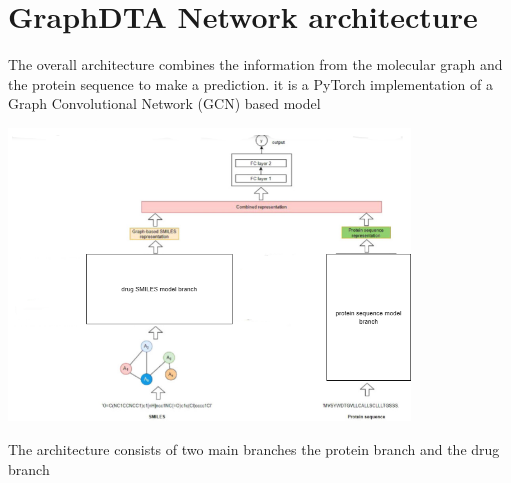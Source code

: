 \documentclass[11pt, a4paper]{article}
\begin{document}
\section{GraphDTA Network architecture}
    The overall architecture combines the information from the molecular graph and the protein sequence to make a prediction. it is a PyTorch implementation of a Graph Convolutional Network (GCN) based model

    \begin{center}
        \includegraphics[width=0.8\textwidth]{model/architecture.drawio.png}
    \end{center}

    The architecture consists of two main branches the protein branch and the drug branch
\end{document}
